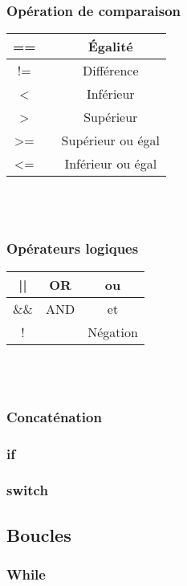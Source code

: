 \documentclass[12pt,a4paper,openany]{article}
\begin{document}
			\subsubsection{Opération de comparaison}
				\begin{tabular}{|c|c|c|}
					\hline	
						== & & Égalité\\
					\hline	
						!= & & Différence\\
					\hline	
						< & & Inférieur\\
					\hline	
						> & & Supérieur\\
					\hline	
						>= & & Supérieur ou égal\\
					\hline	
						<= & & Inférieur ou égal\\
					\hline	
				\end{tabular}\\ \\
			\subsubsection{Opérateurs logiques}
				\begin{tabular}{|c|c|c|}
					\hline
						|| & OR & ou\\
					\hline
						\&\& & AND & et \\
					\hline
						! & & Négation\\
					\hline
				\end{tabular}\\ \\
			\subsubsection{Concaténation}
				
					
			\subsubsection{if}
				
			\subsubsection{switch}
				

		\subsection{Boucles}
			\subsubsection{While}
				
\end{document}
